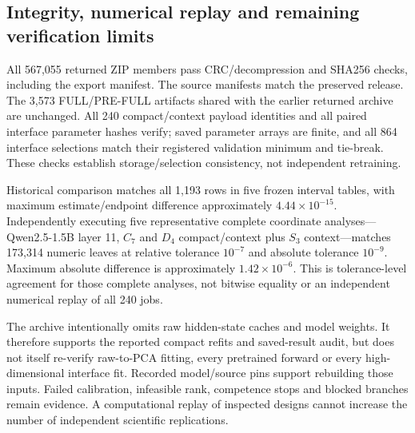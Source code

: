 \subsection{Integrity, numerical replay and remaining verification limits}
All 567,055 returned ZIP members pass CRC/decompression and SHA256 checks, including the export manifest. The source manifests match the preserved release. The 3,573 FULL/PRE-FULL artifacts shared with the earlier returned archive are unchanged. All 240 compact/context payload identities and all paired interface parameter hashes verify; saved parameter arrays are finite, and all 864 interface selections match their registered validation minimum and tie-break. These checks establish storage/selection consistency, not independent retraining.

Historical comparison matches all 1,193 rows in five frozen interval tables, with maximum estimate/endpoint difference approximately $4.44\times10^{-15}$. Independently executing five representative complete coordinate analyses---Qwen2.5-1.5B layer 11, $C_7$ and $D_4$ compact/context plus $S_3$ context---matches 173,314 numeric leaves at relative tolerance $10^{-7}$ and absolute tolerance $10^{-9}$. Maximum absolute difference is approximately $1.42\times10^{-6}$. This is tolerance-level agreement for those complete analyses, not bitwise equality or an independent numerical replay of all 240 jobs.

The archive intentionally omits raw hidden-state caches and model weights. It therefore supports the reported compact refits and saved-result audit, but does not itself re-verify raw-to-PCA fitting, every pretrained forward or every high-dimensional interface fit. Recorded model/source pins support rebuilding those inputs. Failed calibration, infeasible rank, competence stops and blocked branches remain evidence. A computational replay of inspected designs cannot increase the number of independent scientific replications.

